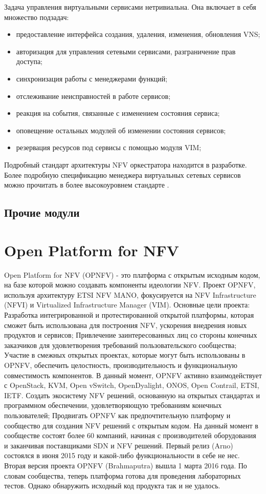 \documentclass[oneside,final,14pt,a4paper]{extreport}
\begin{document}
Задача управления виртуальными сервисами нетривиальна. Она включает в себя множество подзадач:

\begin{itemize}
	\item предоставление интерфейса создания, удаления, изменения, обновления VNS;
	\item авторизация для управления сетевыми сервисами, разграничение прав доступа;
	\item синхронизация работы с менеджерами функций;
	\item отслеживание неисправностей в работе сервисов;
	\item реакция на события, связанные с изменением состояния сервиса;
	\item оповещение остальных модулей об изменении состояния сервисов;
	\item резервация ресурсов под сервисы с помощью модуля VIM;
\end{itemize}

Подробный стандарт архитектуры NFV оркестратора находится в разработке. Более подробную спецификацию менеджера виртуальных сетевых сервисов можно прочитать в более высокоуровнем стандарте \cite{nfv-mano-official-2016-04}.

\subsection{Прочие модули}

\section{Open Platform for NFV}
Open Platform for NFV (OPNFV) - это платформа с открытым исходным кодом, на базе которой можно создавать компоненты  идеологии NFV. Проект OPNFV, используя архитектуру ETSI NFV MANO, фокусируется на NFV Infrastructure (NFVI) и Virtualized Infrastructure Manager (VIM).\cite{opnfv-official}
Основные цели проекта:
Разработка интегрированной и протестированной открытой платформы, которая сможет быть использована для построения NFV, ускорения внедрения новых продуктов и сервисов;
Привлечение заинтересованных лиц со стороны конечных заказчиков для удовлетворения требований пользовательского сообщества;
Участие в смежных открытых проектах, которые могут быть использованы в OPNFV, обеспечить целостность, производительность и функциональную совместимость компонентов. В данный момент, OPNFV активно взаимодействует с OpenStack, KVM, Open vSwitch, OpenDyalight, ONOS, Open Contrail, ETSI, IETF.
Создать экосистему NFV решений, основанную на открытых стандартах и программном обеспечении, удовлетворяющую требованиям конечных пользователей;
Продвигать OPNFV как предпочтительную платформу и сообщество для создания NFV решений с открытым кодом.
На данный момент в сообществе состоят более 60 компаний, начиная с производителей оборудования и заканчивая поставщиками SDN и NFV решений.
Первый релиз (Arno) состоялся в июня 2015 году и какой-либо функциональности в себе не нес. Вторая версия проекта OPNFV (Brahmaputra) вышла 1 марта 2016 года. По словам сообщества, теперь платформа готова для проведения лабораторных тестов.\cite{opnfv-state1} Однако обнаружить исходный код продукта так и не удалось.
\end{document}
